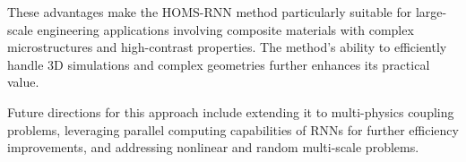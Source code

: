 \documentclass[11pt]{article}
\begin{document}
These advantages make the HOMS-RNN method particularly suitable for large-scale engineering applications involving composite materials with complex microstructures and high-contrast properties. The method's ability to efficiently handle 3D simulations and complex geometries further enhances its practical value.

Future directions for this approach include extending it to multi-physics coupling problems, leveraging parallel computing capabilities of RNNs for further efficiency improvements, and addressing nonlinear and random multi-scale problems.
\end{document}
